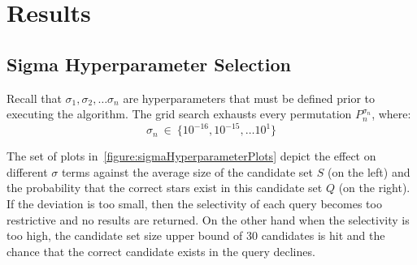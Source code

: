 \section{Results}\label{sec:results}

\subsection{Sigma Hyperparameter Selection}\label{subsec:sigmaHyperparameterSelectionResults}
Recall that $\sigma_1, \sigma_2, \ldots \sigma_n$ are hyperparameters that must be defined prior to executing the
algorithm.
The grid search exhausts every permutation $P_n^{\sigma_n}$, where:
\begin{equation}
    \label{eq:gridSearchQuerySigma}
    \sigma_n \ \in \ \{10^{-16}, 10^{-15}, \ldots 10^{1}\}
\end{equation}

\begin{figure}
\end{figure}

The set of plots in~\autoref{figure:sigmaHyperparameterPlots} depict the effect on different $\sigma$ terms against the
average size of the candidate set $S$ (on the left) and the probability that the correct stars exist in this candidate
set $Q$ (on the right).
If the deviation is too small, then the selectivity of each query becomes too restrictive and no results are returned.
On the other hand when the selectivity is too high, the candidate set size upper bound of 30 candidates is
hit and the chance that the correct candidate exists in the query declines.

